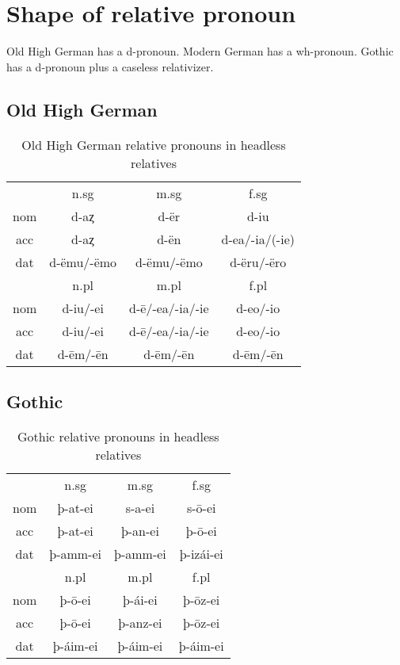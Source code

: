   \section{Shape of relative pronoun}
Old High German has a d-pronoun. Modern German has a wh-pronoun. Gothic has a d-pronoun plus a caseless relativizer.


\subsection{Old High German}

\begin{table}[h]\label{tbl:paradigmohg}
	\center
	\caption {Old High German relative pronouns in headless relatives}
		\begin{tabular}{cccc}
		\toprule
							& \ac{n}.\ac{sg}	    & \ac{m}.\ac{sg}  & \ac{f}.\ac{sg}			\\
								\cmidrule{2-4}
		\ac{nom} & d-aȥ          	& d-ër       	& d-iu						\\
		\ac{acc}	& d-aȥ   					& d-ën				& d-ea/-ia/(-ie)	\\
		\ac{dat}	& d-ëmu/-ëmo	    & d-ëmu/-ëmo	& d-ëru/-ëro			\\
		\bottomrule
	    				& \ac{n}.\ac{pl} & \ac{m}.\ac{pl}       & \ac{f}.\ac{pl}      \\
	    					\cmidrule{2-4}
    \ac{nom} & d-iu/-ei   &  d-ē/-ea/-ia/-ie & d-eo/-io        \\
    \ac{acc} & d-iu/-ei   &  d-ē/-ea/-ia/-ie & d-eo/-io        \\
    \ac{dat} & d-ēm/-ēn   &  d-ēm/-ēn        & d-ēm/-ēn        \\
    \bottomrule
		\end{tabular}
\end{table}


\subsection{Gothic}

\begin{table}[h]
	\center
	\caption {Gothic relative pronouns in headless relatives}
		\begin{tabular}{cccc}
		\toprule
							& \ac{n}.\ac{sg} 	& \ac{m}.\ac{sg}	& \ac{f}.\ac{sg}   \\
		 						\cmidrule{2-4}
    \ac{nom} & þ-at-ei 	 	& s-a-ei 			& s-ō-ei			\\
    \ac{acc}	& þ-at-ei    	& þ-an-ei  		& þ-ō-ei  		\\
    \ac{dat} & þ-amm-ei 		& þ-amm-ei		& þ-izái-ei 	\\
		\bottomrule
    					& \ac{n}.\ac{pl}	& \ac{m}.\ac{pl}	& \ac{f}.\ac{pl}	\\
						    \cmidrule{2-4}
    \ac{nom} & þ-ō-ei			&	þ-ái-ei			&	þ-ōz-ei			\\
    \ac{acc} & þ-ō-ei 			&	þ-anz-ei		&	þ-ōz-ei			\\
    \ac{dat} & þ-áim-ei		&	þ-áim-ei 		&	þ-áim-ei 		\\
    \bottomrule
		\end{tabular}
\end{table}


